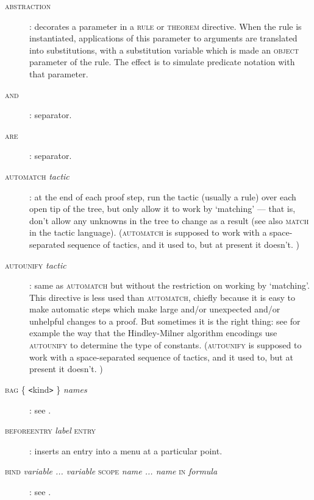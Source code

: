 \begin{description}
\item[\textsc{abstraction}]: decorates a parameter in a \textsc{rule} or \textsc{theorem} directive. When the rule is instantiated, applications of this parameter to arguments are translated into substitutions, with a substitution variable which is made an \textsc{object} parameter of the rule. The effect is to simulate predicate notation with that parameter.

\item[\textsc{and}]: separator.

\item[\textsc{are}]: separator.

\item[\textsc{automatch} %
\textit{tactic}]: at the end of each proof step, run the %
tactic (usually a rule) over each open tip of the tree, but only allow %
it to work by `matching' --- that is, don't allow any unknowns in the tree to change as a result (see also \textsc{match} in the tactic language). (\textsc{automatch} is supposed to work with a space-separated sequence of tactics, and it used to, but at present it doesn't. )

\item[\textsc{autounify} %
\textit{tactic}]: same as \textsc{automatch} but without the restriction on working by `matching'. This directive is less used than \textsc{automatch}, chiefly because it is easy to make automatic steps which make large and/or unexpected and/or unhelpful changes to a proof. But sometimes it is the right thing: see for example the way that the Hindley-Milner algorithm encodings use \textsc{autounify} to determine the type of constants. (\textsc{autounify} is supposed to work with a space-separated sequence of tactics, and it used to, but at present it doesn't. )

\item[\textsc{bag \{} \texttt{<}kind\texttt{>} \textsc{\}} \textit{names}]: see .

\item[\textsc{beforeentry} \textit{label} \textsc{entry}]: inserts an entry into a menu at a particular point.

\item[\textsc{bind} \textit{variable ... variable} \textsc{scope} \textit{name ... name} \textsc{in} \textit{formula}]: see .


\end{description}
